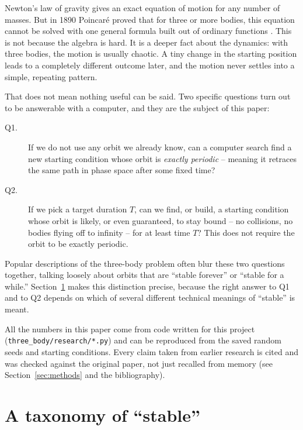 \documentclass[11pt]{article}
\begin{document}
Newton's law of gravity gives an exact equation of motion for any number of
masses. But in 1890 Poincar\'e proved that for three or more bodies, this
equation cannot be solved with one general formula built out of ordinary
functions \cite{ChencinerMontgomery2000}. This is not because the algebra
is hard. It is a deeper fact about the dynamics: with three bodies, the
motion is usually chaotic. A tiny change in the starting position leads to
a completely different outcome later, and the motion never settles into a
simple, repeating pattern.

That does not mean nothing useful can be said. Two specific questions turn
out to be answerable with a computer, and they are the subject of this
paper:

\begin{description}
  \item[Q1.] If we do not use any orbit we already know, can a computer
    search find a new starting condition whose orbit is \emph{exactly
    periodic} -- meaning it retraces the same path in phase space after
    some fixed time?
  \item[Q2.] If we pick a target duration $T$, can we find, or build, a
    starting condition whose orbit is likely, or even guaranteed, to stay
    bound -- no collisions, no bodies flying off to infinity -- for at
    least time $T$? This does not require the orbit to be exactly
    periodic.
\end{description}

Popular descriptions of the three-body problem often blur these two
questions together, talking loosely about orbits that are ``stable
forever'' or ``stable for a while.'' Section~\ref{sec:taxonomy} makes this
distinction precise, because the right answer to Q1 and to Q2 depends on
which of several different technical meanings of ``stable'' is meant.

All the numbers in this paper come from code written for this project
(\texttt{three\_body/research/*.py}) and can be reproduced from the saved
random seeds and starting conditions. Every claim taken from earlier
research is cited and was checked against the original paper, not just
recalled from memory (see Section~\ref{sec:methods} and the bibliography).

\section{A taxonomy of ``stable''}
\label{sec:taxonomy}
\end{document}
